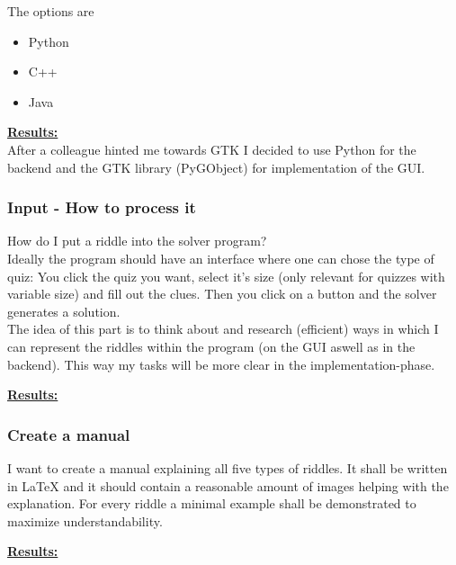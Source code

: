 \documentclass{article}
\begin{document}
	The options are
	\begin{itemize}
		\item Python
		\item C++
		\item Java
	\end{itemize}

	\begin{framed}
		\textbf{\underline{Results:}}\\
		After a colleague hinted me towards GTK I decided to use Python for the backend and the GTK library (PyGObject) for implementation of the GUI.
	\end{framed}
	
	\subsubsection*{Input - How to process it}
	
	How do I put a riddle into the solver program? \\
	Ideally the program should have an interface where one can chose the type of quiz: You click the quiz you want, select it's size (only relevant for quizzes with variable size) and fill out the clues. Then you click on a button and the solver generates a solution. \\
	
	The idea of this part is to think about and research (efficient) ways in which I can represent the riddles within the program (on the GUI aswell as in the backend). This way my tasks will be more clear in the implementation-phase.
	
	\begin{framed}
		\textbf{\underline{Results:}}\\
	\end{framed}
	
	\subsubsection*{Create a manual}
	
	I want to create a manual explaining all five types of riddles. It shall be written in LaTeX and it should contain a reasonable amount of images helping with the explanation. For every riddle a minimal example shall be demonstrated to maximize understandability.
	
	\begin{framed}
		\textbf{\underline{Results:}}\\
	\end{framed}
	
\end{document}
